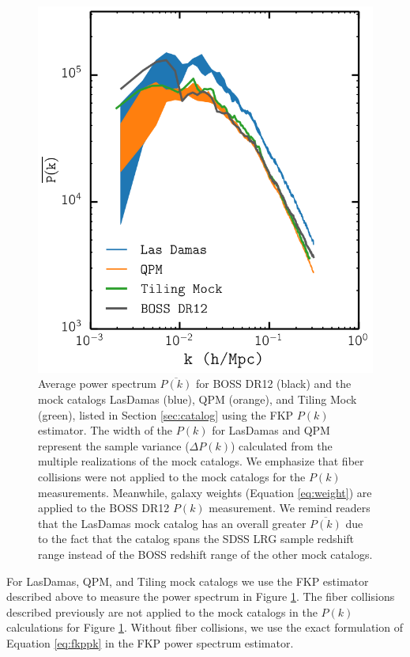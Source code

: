 \documentclass{emulateapj}
\begin{document}
\begin{figure}
\begin{center}
\includegraphics[scale=0.5]{fcpaper_pk_comp.png} 
\caption{Average power spectrum $\overline{P(k)}$ for BOSS DR12 (black) and the mock catalogs LasDamas (blue), QPM (orange), and Tiling Mock (green), listed in Section \ref{sec:catalog} using the FKP $P(k)$ estimator. The width of the $P(k)$ for LasDamas and QPM represent the sample variance ($\Delta P(k)$) calculated from the multiple realizations of the mock catalogs. We emphasize that fiber collisions were not applied to the mock catalogs for the $P(k)$ measurements. Meanwhile, galaxy weights (Equation \ref{eq:weight}) are applied to the BOSS DR12 $P(k)$ measurement. We remind readers that the LasDamas mock catalog has an overall greater $\overline{P(k)}$ due to the fact that the catalog spans the SDSS LRG sample redshift range instead of the BOSS redshift range of the other mock catalogs.} \label{fig:mockpk}
\end{center}
\end{figure}

For LasDamas, QPM, and Tiling mock catalogs we use the FKP estimator described above to measure the power spectrum in Figure \ref{fig:mockpk}. The fiber collisions described previously are not applied to the mock catalogs in the $P(k)$ calculations for Figure \ref{fig:mockpk}. Without fiber collisions, we use the exact formulation of Equation \ref{eq:fkppk} in the FKP power spectrum estimator. 
\end{document}

